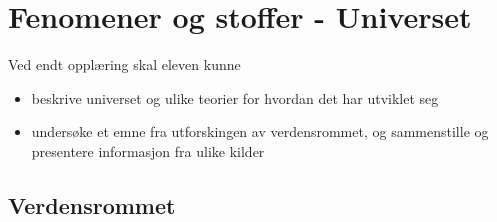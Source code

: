 \documentclass[main.tex]{subfiles}
\begin{document}
\section{Fenomener og stoffer - Universet} 
Ved endt opplæring skal eleven kunne
\begin{itemize}[noitemsep]
\item beskrive universet og ulike teorier for hvordan det har utviklet seg
\item undersøke et emne fra utforskingen av verdensrommet, og sammenstille og presentere informasjon fra ulike kilder
\end{itemize}

\subsection{Verdensrommet}
\end{document}
